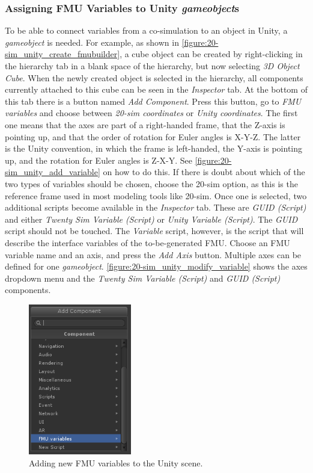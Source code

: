 \subsubsection{Assigning FMU Variables to Unity \textit{gameobject}s}
To be able to connect variables from a co-simulation to an object in Unity, a \textit{gameobject} is needed. For example, as shown in \autoref{figure:20-sim_unity_create_fmubuilder}, a cube object can be created by right-clicking in the hierarchy tab in a blank space of the hierarchy, but now selecting \textit{3D Object \textrightarrow Cube}.
%
When the newly created object is selected in the hierarchy, all components currently attached to this cube can be seen in the \textit{Inspector} tab.
%
At the bottom of this tab there is a button named \textit{Add Component}. Press this button, go to \textit{FMU variables} and choose between \textit{20-sim coordinates} or \textit{Unity coordinates}.
%
The first one means that the axes are part of a right-handed frame, that the Z-axis is pointing up, and that the order of rotation for Euler angles is X-Y-Z.
%
The latter is the Unity convention, in which the frame is left-handed, the Y-axis is pointing up, and the rotation for Euler angles is Z-X-Y.
%
See \autoref{figure:20-sim_unity_add_variable} on how to do this.
%
If there is doubt about which of the two types of variables should be chosen, choose the 20-sim option, as this is the reference frame used in most modeling tools like 20-sim.
%
Once one is selected, two additional scripts become available in the \textit{Inspector} tab. These are \textit{GUID (Script)} and either \textit{Twenty Sim Variable (Script)} or \textit{Unity Variable (Script)}. The \textit{GUID} script should not be touched. The \textit{Variable} script, however, is the script that will describe the interface variables of the to-be-generated FMU. Choose an FMU variable name and an axis, and press the \textit{Add Axis} button. Multiple axes can be defined for one \textit{gameobject}. \autoref{figure:20-sim_unity_modify_variable} shows the axes dropdown menu and the \textit{Twenty Sim Variable (Script)} and \textit{GUID (Script)} components. 

\begin{figure}[ht]
	\centerline{\includegraphics[width=0.4\textwidth]{figures/20sim_Unity5.png}}
	\caption{Adding new FMU variables to the Unity scene.}
	\label{figure:20-sim_unity_add_variable}
\end{figure}

